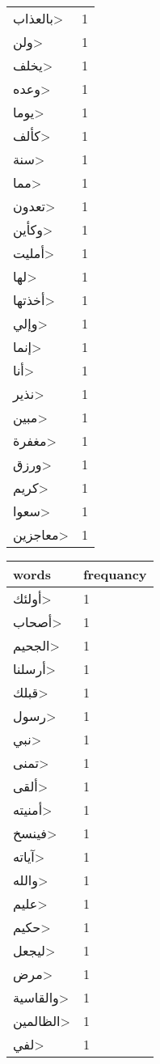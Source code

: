 \documentclass{article}
\begin{document}
\begin{multicols}{3}
\begin{center}
\begin{tabular}{ P{2cm}  P{1cm}}
\<بالعذاب> & 1 \\ 
\<ولن> & 1 \\ 
\<يخلف> & 1 \\ 
\<وعده> & 1 \\ 
\<يوما> & 1 \\ 
\<كألف> & 1 \\ 
\<سنة> & 1 \\ 
\<مما> & 1 \\ 
\<تعدون> & 1 \\ 
\<وكأين> & 1 \\ 
\<أمليت> & 1 \\ 
\<لها> & 1 \\ 
\<أخذتها> & 1 \\ 
\<وإلي> & 1 \\ 
\<إنما> & 1 \\ 
\<أنا> & 1 \\ 
\<نذير> & 1 \\ 
\<مبين> & 1 \\ 
\<مغفرة> & 1 \\ 
\<ورزق> & 1 \\ 
\<كريم> & 1 \\ 
\<سعوا> & 1 \\ 
\<معاجزين> & 1 \\ 
\end{tabular} 
\begin{tabular}{ P{2cm}  P{1cm}} 
\textbf{words}    & \textbf{frequancy}  \\
\hline
\<أولئك> & 1 \\ 
\<أصحاب> & 1 \\ 
\<الجحيم> & 1 \\ 
\<أرسلنا> & 1 \\ 
\<قبلك> & 1 \\ 
\<رسول> & 1 \\ 
\<نبي> & 1 \\ 
\<تمنى> & 1 \\ 
\<ألقى> & 1 \\ 
\<أمنيته> & 1 \\ 
\<فينسخ> & 1 \\ 
\<آياته> & 1 \\ 
\<والله> & 1 \\ 
\<عليم> & 1 \\ 
\<حكيم> & 1 \\ 
\<ليجعل> & 1 \\ 
\<مرض> & 1 \\ 
\<والقاسية> & 1 \\ 
\<الظالمين> & 1 \\ 
\<لفي> & 1 \\ 

\end{tabular}
\end{center}
\end{multicols}
\end{document}
